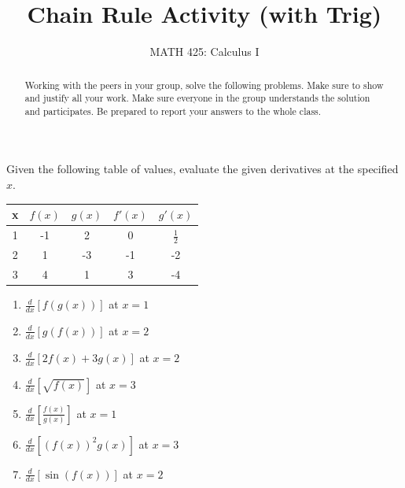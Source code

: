 \documentclass{ximera}
\title{Chain Rule Activity (with Trig)}  %
\author{MATH 425: Calculus I}
\begin{document}
\begin{abstract}
    Working with the peers in your group, solve the following problems. Make sure to show and justify all your work. Make sure everyone in the group understands the solution and participates. Be prepared to report your answers to the whole class. 
\end{abstract}
\maketitle


\begin{exercise}
    Given the following table of values, evaluate the given derivatives at the specified $x$.\\
    \begin{tabular}{c|c|c|c|c}
        x & $f(x)$ & $g(x)$ & $f'(x)$ & $g'(x)$  \\ \hline
        1 & -1 & 2 & 0 & $\frac{1}{2}$\\
        2 & 1 & -3 & -1 & -2 \\
        3 & 4 & 1 & 3 & -4 
    \end{tabular}
    \begin{enumerate}
        \item[a.] $\frac{d}{dx}[f(g(x))]$ at $x=1$

        \item[b.] $\frac{d}{dx}[g(f(x))]$ at $x=2$

        \item[c.] $\frac{d}{dx}[2f(x)+3g(x)]$ at $x=2$

        \item[d.] $\frac{d}{dx}[\sqrt{f(x)}]$ at $x=3$

        \item[e.] $\frac{d}{dx}[\frac{f(x)}{g(x)}]$ at $x=1$

        \item[f.] $\frac{d}{dx}[(f(x))^2g(x)]$ at $x=3$

        \item $\frac{d}{dx}[\sin(f(x))]$ at $x=2$
    \end{enumerate}
\end{exercise}
\end{document}
